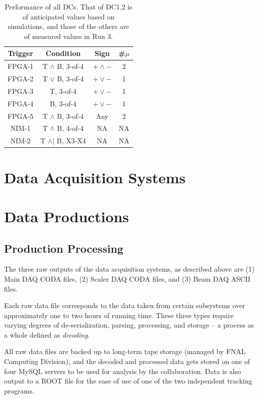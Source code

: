 \begin{table}[bthp]\centering
  \caption{Performance of all DCs.
    That of DC1.2 is of anticipated values based on simulations,
    and those of the others are of measured values in Run 3.}
  \label{tab:cham:performance1}
  \begin{tabular}{c|ccc}
    \hline
    Trigger & Condition       & Sign    & \#$\mu$ \\
    \hline
    FPGA-1   &    T $\land$ B, 3-of-4    &   $+\land-$    &   2 \\
    FPGA-2   &    T $\lor$ B, 3-of-4      &  $+\lor-$       &  1 \\
    FPGA-3     &  T, 3-of-4       &    $+\lor-$   &   1  \\
    FPGA-4    &   B, 3-of-4       &    $+\lor-$    &   1 \\
    FPGA-5  &     T $\land$ B, 3-of-4       &     Any  &   2  \\
    NIM-1  &     T $\land$ B, 4-of-4       &     NA    &   NA   \\
    NIM-2  &     T $\land |$ B, X3-X4       &     NA    &   NA   \\
    \hline
  \end{tabular}
\end{table}

\section{Data Acquisition Systems}

\section{Data Productions}

\subsection{Production Processing}

The three raw outputs of the data acquisition systems, as described above are (1) Main DAQ CODA files, (2) Scaler DAQ CODA files, and (3) Beam DAQ ASCII files.

Each raw data file corresponds to the data taken from certain subsystems over approximately one to two hours of running time. These three types require varying degrees of de-serialization, parsing, processing, and storage -- a process as a whole defined as \emph{decoding}. 

All raw data files are backed up to long-term tape storage (managed by FNAL Computing Division), and the decoded and processed data gets stored on one of four MySQL servers to be used for analysis by the collaboration. Data is also output to a ROOT file for the ease of use of one of the two independent tracking programs.

